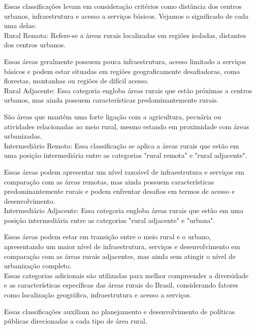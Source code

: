 \documentclass{article}
\begin{document}
Essas classificações levam em consideração critérios como distância dos centros urbanos, infraestrutura e acesso a serviços básicos. Vejamos o significado de cada uma delas:\\

Rural Remota: Refere-se a áreas rurais localizadas em regiões isoladas, distantes dos centros urbanos.

Essas áreas geralmente possuem pouca infraestrutura, acesso limitado a serviços básicos e podem estar situadas em regiões geograficamente desafiadoras, como florestas, montanhas ou regiões de difícil acesso.\\

Rural Adjacente: Essa categoria engloba áreas rurais que estão próximas a centros urbanos, mas ainda possuem características predominantemente rurais.

São áreas que mantêm uma forte ligação com a agricultura, pecuária ou atividades relacionadas ao meio rural, mesmo estando em proximidade com áreas urbanizadas.\\

Intermediário Remoto: Essa classificação se aplica a áreas rurais que estão em uma posição intermediária entre as categorias "rural remota" e "rural adjacente".

Essas áreas podem apresentar um nível razoável de infraestrutura e serviços em comparação com as áreas remotas, mas ainda possuem características predominantemente rurais e podem enfrentar desafios em termos de acesso e desenvolvimento.\\

Intermediário Adjacente: Essa categoria engloba áreas rurais que estão em uma posição intermediária entre as categorias "rural adjacente" e "urbana".

Essas áreas podem estar em transição entre o meio rural e o urbano, apresentando um maior nível de infraestrutura, serviços e desenvolvimento em comparação com as áreas rurais adjacentes, mas ainda sem atingir o nível de urbanização completo.\\

Essas categorias adicionais são utilizadas para melhor compreender a diversidade e as características específicas das áreas rurais do Brasil, considerando fatores como localização geográfica, infraestrutura e acesso a serviços.

Essas classificações auxiliam no planejamento e desenvolvimento de políticas públicas direcionadas a cada tipo de área rural.
\end{document}
